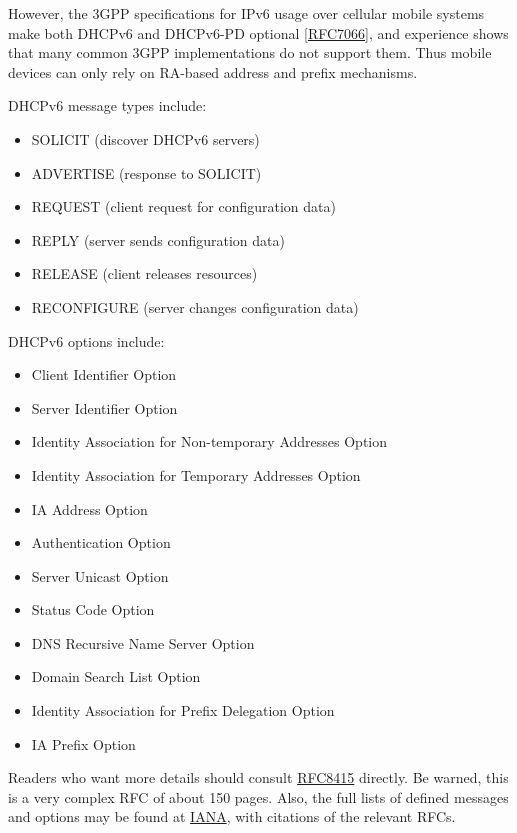 \documentclass[
]{article}
\providecommand{\tightlist}{%
  \setlength{\itemsep}{0pt}\setlength{\parskip}{0pt}}
\begin{document}
However, the 3GPP specifications for IPv6 usage over cellular mobile
systems make both DHCPv6 and DHCPv6-PD optional
{[}\href{https://www.rfc-editor.org/info/rfc7066}{RFC7066}{]}, and
experience shows that many common 3GPP implementations do not support
them. Thus mobile devices can only rely on RA-based address and prefix
mechanisms.

DHCPv6 message types include:

\begin{itemize}
\tightlist
\item
  SOLICIT (discover DHCPv6 servers)
\item
  ADVERTISE (response to SOLICIT)
\item
  REQUEST (client request for configuration data)
\item
  REPLY (server sends configuration data)
\item
  RELEASE (client releases resources)
\item
  RECONFIGURE (server changes configuration data)
\end{itemize}

DHCPv6 options include:

\begin{itemize}
\tightlist
\item
  Client Identifier Option
\item
  Server Identifier Option
\item
  Identity Association for Non-temporary Addresses Option
\item
  Identity Association for Temporary Addresses Option
\item
  IA Address Option
\item
  Authentication Option
\item
  Server Unicast Option
\item
  Status Code Option
\item
  DNS Recursive Name Server Option
\item
  Domain Search List Option
\item
  Identity Association for Prefix Delegation Option
\item
  IA Prefix Option
\end{itemize}

Readers who want more details should consult
\href{https://www.rfc-editor.org/info/rfc8415}{RFC8415} directly. Be
warned, this is a very complex RFC of about 150 pages. Also, the full
lists of defined messages and options may be found at
\href{https://www.iana.org/assignments/dhcpv6-parameters/dhcpv6-parameters.xhtml}{IANA},
with citations of the relevant RFCs.
\end{document}
